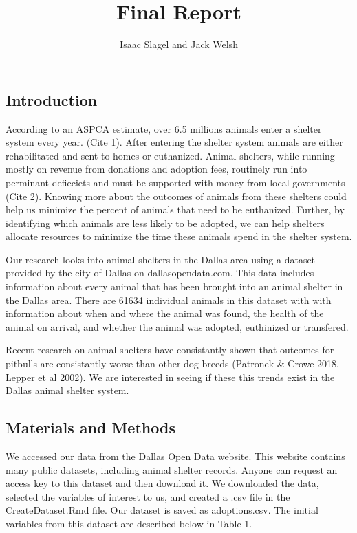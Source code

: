 \documentclass[]{article}
\title{Final Report}
\author{Isaac Slagel and Jack Welsh}
\date{}
\begin{document}
\maketitle

\subsection{Introduction}\label{introduction}

According to an ASPCA estimate, over 6.5 millions animals enter a
shelter system every year. (Cite 1). After entering the shelter system
animals are either rehabilitated and sent to homes or euthanized. Animal
shelters, while running mostly on revenue from donations and adoption
fees, routinely run into perminant defieciets and must be supported with
money from local governments (Cite 2). Knowing more about the outcomes
of animals from these shelters could help us minimize the percent of
animals that need to be euthanized. Further, by identifying which
animals are less likely to be adopted, we can help shelters allocate
resources to minimize the time these animals spend in the shelter
system.

Our research looks into animal shelters in the Dallas area using a
dataset provided by the city of Dallas on dallasopendata.com. This data
includes information about every animal that has been brought into an
animal shelter in the Dallas area. There are 61634 individual animals in
this dataset with with information about when and where the animal was
found, the health of the animal on arrival, and whether the animal was
adopted, euthinized or transfered.

Recent research on animal shelters have consistantly shown that outcomes
for pitbulls are consistantly worse than other dog breeds (Patronek \&
Crowe 2018, Lepper et al 2002). We are interested in seeing if these
this trends exist in the Dallas animal shelter system.

\subsection{Materials and Methods}\label{materials-and-methods}

We accessed our data from the Dallas Open Data website. This website
contains many public datasets, including
\href{https://www.dallasopendata.com/City-Services/Dallas-Animal-Shelter-Data/7h2m-3um5}{animal
shelter records}. Anyone can request an access key to this dataset and
then download it. We downloaded the data, selected the variables of
interest to us, and created a .csv file in the CreateDataset.Rmd file.
Our dataset is saved as adoptions.csv. The initial variables from this
dataset are described below in Table 1.
\end{document}

